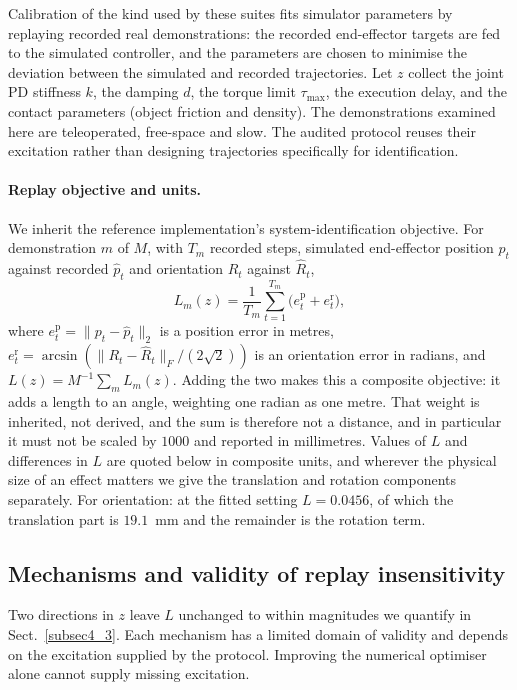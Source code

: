 \documentclass[pdflatex,iicol,sn-apa]{sn-jnl}
\theoremstyle{remark}
\begin{document}
Calibration of the kind used by these suites fits simulator parameters by replaying recorded real
demonstrations: the recorded end-effector targets are fed to the simulated controller, and the
parameters are chosen to minimise the deviation between the simulated and recorded trajectories. Let
$z$ collect the joint PD stiffness $k$, the damping $d$, the torque limit $\tau_{\max}$, the
execution delay, and the contact parameters (object friction and density). The demonstrations
examined here are teleoperated, free-space and slow. The audited protocol reuses their excitation
rather than designing trajectories specifically for identification.

\paragraph{Replay objective and units.}
We inherit the reference implementation's system-identification objective. For demonstration $m$ of
$M$, with $T_m$ recorded steps, simulated end-effector position $p_t$ against recorded $\hat p_t$
and orientation $R_t$ against $\hat R_t$,
\begin{equation}\label{eq:loss}
L_m(z) = \frac{1}{T_m} \sum_{t=1}^{T_m} \big( e^{\mathrm{p}}_t + e^{\mathrm{r}}_t \big),
\end{equation}
where $e^{\mathrm{p}}_t = \lVert p_t - \hat p_t \rVert_2$ is a position error in metres,
$e^{\mathrm{r}}_t = \arcsin(\lVert R_t - \hat R_t\rVert_F/(2\sqrt2))$ is an orientation error in
radians, and $L(z) = M^{-1}\sum_m L_m(z)$. Adding the two makes this a composite
objective: it adds a length to an
angle, weighting one radian as one metre. That weight is inherited, not derived, and the sum is
therefore not a distance, and in particular it must not be scaled by $1000$ and reported in
millimetres. Values of
$L$ and differences in $L$ are quoted below in composite units, and wherever the physical size
of an effect matters we give the translation and rotation components separately. For orientation:
at the fitted setting $L = 0.0456$, of which the translation part is $19.1$~mm and the remainder is
the rotation term.

\subsection{Mechanisms and validity of replay insensitivity}\label{subsec4_2}

Two directions in $z$ leave $L$ unchanged to within magnitudes we quantify in
Sect.~\ref{subsec4_3}. Each mechanism has a limited domain of validity and depends on the excitation supplied by
the protocol. Improving the numerical optimiser alone cannot supply missing excitation.
\end{document}
